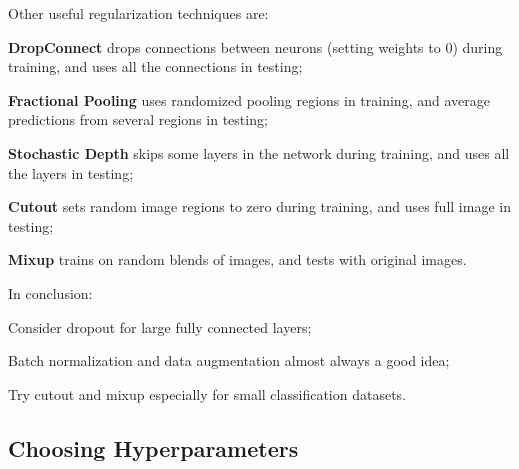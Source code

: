 \newpage
Other useful regularization techniques are:
\begin{myitem}
    \item \textbf{DropConnect} drops connections between neurons (setting weights to 0) during training, and uses all the connections in testing;
    \item \textbf{Fractional Pooling} uses randomized pooling regions in training, and average predictions from several regions in testing;
    \item \textbf{Stochastic Depth} skips some layers in the network during training, and uses all the layers in testing;
    \item \textbf{Cutout} sets random image regions to zero during training, and uses full image in testing;
    \item \textbf{Mixup} trains on random blends of images, and tests with original images.
\end{myitem}

In conclusion:
\begin{myitem}
    \item Consider dropout for large
    fully connected layers;
    \item Batch normalization and data augmentation almost always a good idea;
    \item Try cutout and mixup especially for small classification datasets.
\end{myitem}


\subsection{Choosing Hyperparameters}\label{sec:tnn-hyperparameters}

